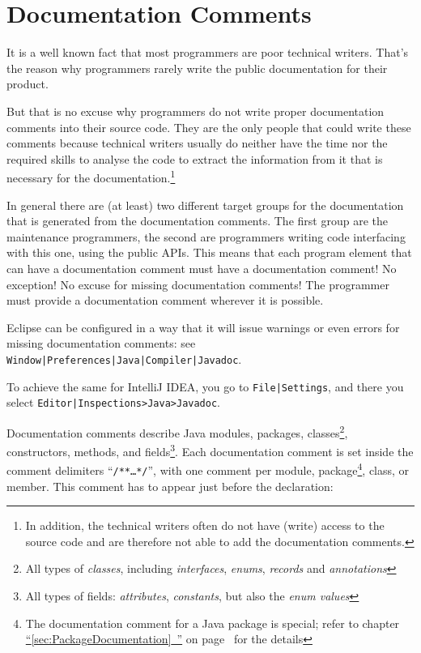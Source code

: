 \documentclass[11pt,a4paper, titlepage, parskip=half, headsepline, footsepline, cleardoublepage=current, headheight=1cm]{scrbook}
\newcommand*{\tqfullvref}[1]{\hyperref[{#1}]{“\ref*{#1}~\nameref*{#1}”} on page~\pageref{#1}}
\begin{document}
\section{Documentation Comments}\label{sec:DocumentationComments}
It is a well known fact that most programmers are poor technical writers. That's the reason why programmers rarely write the public documentation for their product.

But that is no excuse why programmers do not write proper documentation comments into their source code. They are the only people that could write these comments because technical writers usually do neither have the time nor the required skills to analyse the code to extract the information from it that is necessary for the documentation.\footnote{In addition, the technical writers often do not have (write) access to the source code and are therefore not able to add the documentation comments.}

In general there are (at least) two different target groups for the documentation that is generated from the documentation comments. The first group are the maintenance programmers, the second are programmers writing code interfacing with this one, using the public APIs. This means that each program element that can have a documentation comment must have a documentation comment! No exception! No excuse for missing documentation comments! The programmer must provide a documentation comment wherever it is possible. 

Eclipse can be configured in a way that it will issue warnings or even errors for missing documentation comments: see \verb#Window|Preferences|Java|Compiler|Javadoc#.

To achieve the same for IntelliJ IDEA, you go to \verb#File|Settings#, and there you select \verb#Editor|Inspections>Java>Javadoc#.

Documentation comments describe Java modules, packages, classes\footnote{All types of \textit{classes}, including \textit{interfaces}, \textit{enums}, \textit{records} and \textit{annotations}}, constructors, methods, and fields\footnote{All types of fields: \textit{attributes}, \textit{constants}, but also the \textit{enum values}}. Each documentation comment is set inside the comment delimiters “\verb#/**…*/#”, with one comment per module, package\footnote{The documentation comment for a Java package is special; refer to chapter \tqfullvref{sec:PackageDocumentation} for the details}, class, or member. This comment has to appear just before the declaration:
\end{document}
